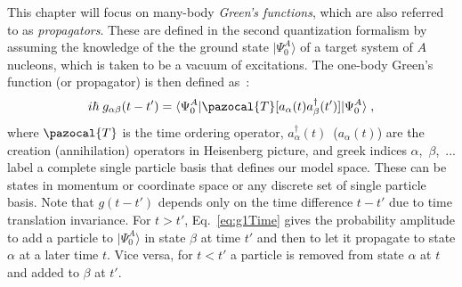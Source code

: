 This chapter will focus on many-body {\em  Green's functions}, which are also referred to as {\em propagators}. These are defined  in the 
second quantization formalism by assuming the knowledge of the the ground state $\vert\Psi^A_0\rangle$ of a target system of $A$ nucleons, which
is taken to be a vacuum of excitations.  The one-body Green's function (or propagator) is then defined as~\cite{ch11_FetterWalecka,ch11_Dickhoff2008}:
\begin{equation}
 i\hbar \; g_{\alpha\beta}(t - t') =  \langle\Psi^A_0\vert  \pazocal{T} [ a_\alpha(t)   a^\dagger_\beta(t') ]  \vert\Psi^A_0\rangle \; ,
 \label{eq:g1Time}
\end{equation}
where $\pazocal{T}$ is the time ordering operator, $a^\dagger_\alpha(t)$~($a_\alpha(t)$) are the creation (annihilation) operators in Heisenberg picture,
and  greek indices $\alpha$,~$\beta$,~... label a complete single particle basis that defines our  model space. These can be states in momentum or coordinate space or any discrete set of single particle basis. Note that $ g(t - t')$ depends only on the time difference $t-t'$ due to time translation invariance.
For $t>t'$, Eq.~\eqref{eq:g1Time} gives the probability amplitude to add a particle to $\vert\Psi^A_0\rangle$ in state $\beta$  at time $t'$ and then to let it propagate to state $\alpha$ at a later time $t$. Vice versa, for $t<t'$ a particle is removed from state $\alpha$ at $t$ and added to $\beta$ at $t'$.

